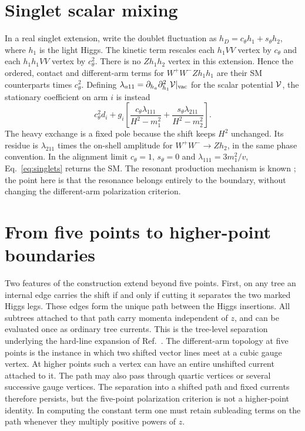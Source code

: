 \documentclass[11pt,a4paper]{article}
\begin{document}
\section{Singlet scalar mixing}
In a real singlet extension, write the doublet fluctuation as
\(h_D=c_\theta h_1+s_\theta h_2\), where \(h_1\) is the light Higgs.
The kinetic term rescales each \(h_1VV\) vertex by \(c_\theta\)
and each \(h_1h_1VV\) vertex by \(c_\theta^2\).
There is no \(Zh_1h_2\) vertex in this extension. Hence the ordered,
contact and different-arm terms for \(W^+W^-Zh_1h_1\) are their SM
counterparts times \(c_\theta^2\). Defining
\(\lambda_{a11}=\partial_{h_a}\partial_{h_1}^2{\cal V}|_{\rm vac}\)
for the scalar potential \({\cal V}\), the stationary coefficient
on arm \(i\) is instead
\begin{equation}
 c_\theta^2d_i+
 g_i\left[
 \frac{c_\theta\lambda_{111}}{H^2-m_1^2}+
 \frac{s_\theta\lambda_{211}}{H^2-m_2^2}
 \right].
 \label{eq:singlets}
\end{equation}
The heavy exchange is a fixed pole because the shift keeps \(H^2\)
unchanged. Its residue is \(\lambda_{211}\) times the on-shell
amplitude for \(W^+W^-\to Zh_2\), in the same phase convention.
In the alignment limit \(c_\theta=1\), \(s_\theta=0\) and
\(\lambda_{111}=3m_1^2/v\), Eq.~\eqref{eq:singlets}
returns the SM. The resonant production mechanism is known
\cite{Kotwal}; the point here is that the resonance belongs entirely
to the boundary, without changing the different-arm polarization
criterion.

\section{From five points to higher-point boundaries}
\label{sec:higher}
Two features of the construction extend beyond five points.
First, on any tree an internal edge carries the shift if and only
if cutting it separates the two marked Higgs legs. These edges form
the unique path between the Higgs insertions. All subtrees attached to
that path carry momenta independent of \(z\), and can be evaluated once
as ordinary tree currents. This is the tree-level separation
underlying the hard-line expansion of Ref.~\cite{ArkaniKaplan}. The different-arm topology at five points
is the instance in which two shifted vector lines meet at a cubic
gauge vertex. At higher points such a vertex can have an entire
unshifted current attached to it. The path may also pass through
quartic vertices or several successive gauge vertices. The separation
into a shifted path and fixed currents therefore persists, but the
five-point polarization criterion is not a higher-point identity.
In computing the constant term one must retain subleading terms on
the path whenever they multiply positive powers of \(z\).
\end{document}
